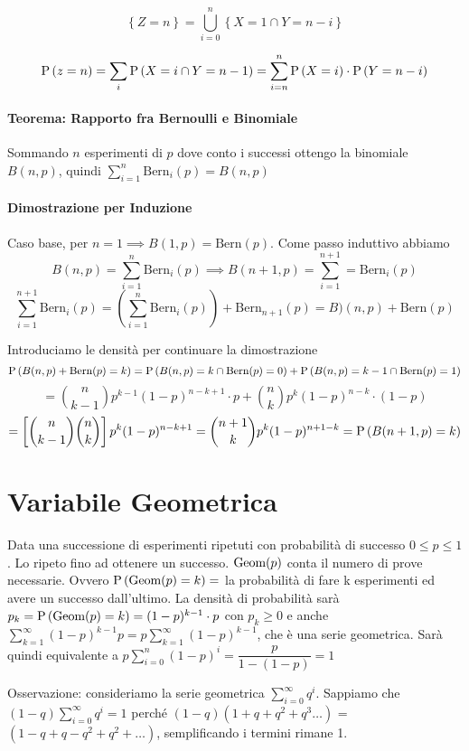 \[ \left\{Z = n\right\} = \bigcup_{i=0}^{n} \left\{X = 1 \cap Y = n - i \right\} \]

\[ \text{P}\left(z=n\right) = \sum_{i} \text{P}\left(X = i \cap Y = n-1\right) = \sum_{i = n}^{n} \text{P}\left(X=i\right) \cdot \text{P}\left(Y=n-i\right) \]

\paragraph{Teorema: Rapporto fra Bernoulli e Binomiale}

Sommando $ n $ esperimenti di $ p $ dove conto i successi ottengo la binomiale $ B(n,p) $, quindi $ \sum_{i=1}^{n} \text{Bern}_i(p) = B(n,p) $

\paragraph{Dimostrazione per Induzione}
Caso base, per $ n = 1 \implies B(1,p) = \text{Bern}(p)$. Come passo induttivo abbiamo 
\[ B(n,p) = \sum_{i=1}^{n} \text{Bern}_i(p) \implies B(n+1,p) = \sum_{i=1}^{n+1} = \text{Bern}_i(p) \]
\[ \sum_{i=1}^{n+1} \text{Bern}_i(p) = \left( \sum_{i=1}^{n} \text{Bern}_i(p) \right) + \text{Bern}_{n+1}(p) = B)(n,p) + \text{Bern}(p) \]

Introduciamo le densità per continuare la dimostrazione
\[ \text{P}\left(B(n,p) + \text{Bern}(p) = k\right) = \text{P}\left(B(n,p) = k \cap \text{Bern}(p) = 0\right) + \text{P}\left(B(n,p) = k-1 \cap \text{Bern}(p) = 1\right) \]
\[ = \binom{n}{k-1}p^{k-1}(1-p)^{n-k+1} \cdot p + \binom{n}{k}p^k(1-p)^{n-k} \cdot  (1-p) \]
\[ = \left[\binom{n}{k-1}\binom{n}{k}\right] p^k (1-p)^{n-k+1} = \binom{n+1}{k} p^k (1-p)^{n+1-k} = \text{P}\left(B(n+1,p) = k\right)\]

\section{Variabile Geometrica}
Data una successione di esperimenti ripetuti con probabilità di successo $ 0 \leq p \leq 1 $. Lo ripeto fino ad ottenere un successo. $ \text{Geom}(p) $ conta il numero di prove necessarie. Ovvero $ \text{P}\left(\text{Geom}(p) = k\right) = $ la probabilità di fare k esperimenti ed avere un successo dall'ultimo. La densità di probabilità sarà $ p_k = \text{P}\left(\text{Geom}(p) = k\right) = (1-p)^{k-1} \cdot p $ con $ p_k \geq 0 $ e anche $ \sum_{k=1}^{\infty} (1-p)^{k-1} p = p \sum_{k=1}^{\infty}(1-p)^{k-1} $, che è una serie geometrica. Sarà quindi equivalente a $ p \sum_{i=0}^{n} (1-p)^i = \dfrac{p}{1-(1-p)} = 1$


Osservazione: consideriamo la serie geometrica $ \sum_{i=0}^{\infty} q^i $.
Sappiamo che $ (1-q) \sum_{i=0}^{\infty} q^i = 1 $ perché $ (1-q)(1+q+q^2+q^3\dots) $ = $( 1 - q + q - q^2 + q^2 + \dots )$, semplificando i termini rimane 1.

